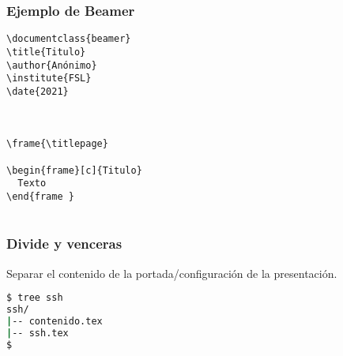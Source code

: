 \begin{frame}[fragile]
  \frametitle{Ejemplo de Beamer}
  \begin{lstlisting}[language={[LaTeX]TeX}]
\documentclass{beamer}
\title{Titulo}
\author{Anónimo}
\institute{FSL}
\date{2021}



\frame{\titlepage}

\begin{frame}[c]{Titulo}
  Texto
\end{frame }


  \end{lstlisting}
\end{frame}

\begin{frame}[fragile]
  \frametitle{Divide y venceras}
  Separar el contenido de la portada/configuración de la presentación.
  \begin{lstlisting}[language=Bash,numbers=none]
$ tree ssh
ssh/
|-- contenido.tex
|-- ssh.tex
$
  \end{lstlisting}
\end{frame}


\begin{frame}[c]{}
  \pausa
  \vspace{\baselineskip}
\end{frame}

